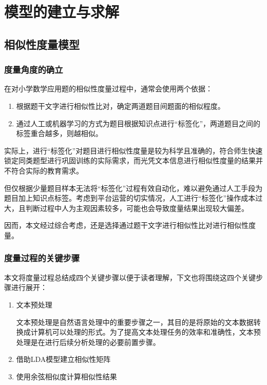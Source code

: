 \section{模型的建立与求解}

\subsection{相似性度量模型}

\subsubsection{度量角度的确立}

在对小学数学应用题的相似性度量过程中，通常会使用两个依据：

\begin{enumerate}
    \item 根据题干文字进行相似性比对，确定两道题目间题面的相似程度。
    \item 通过人工或机器学习的方式为题目根据知识点进行“标签化”，两道题目之间的标签重合越多，则越相似。
\end{enumerate}

实际上，进行“标签化”对题目进行相似性度量是较为科学且准确的，符合师生快速锁定同类题型进行巩固训练的实际需求，而光凭文本信息进行相似性度量的结果并不符合实际的教育需求。

但仅根据少量题目样本无法将“标签化”过程有效自动化，难以避免通过人工手段为题目加上知识点标签。考虑到平台运营的切实情况，人工进行“标签化”操作成本过大，且判断过程中人为主观因素较多，可能也会导致度量结果出现较大偏差。

因而，本文经过综合考虑，还是选择通过题干文字进行相似性比对进行相似性度量。

\subsubsection{度量过程的关键步骤}


本文将度量过程总结成四个关键步骤以便于读者理解，下文也将围绕这四个关键步骤进行展开：

\begin{enumerate}
    \item 文本预处理
    
    文本预处理是自然语言处理中的重要步骤之一，其目的是将原始的文本数据转换成计算机可以处理的形式。为了提高文本处理任务的效率和准确性，文本预处理是在进行后续分析处理的必要前置步骤。

    \item 借助LDA模型建立相似性矩阵
    \item 使用余弦相似度计算相似性结果
\end{enumerate}

